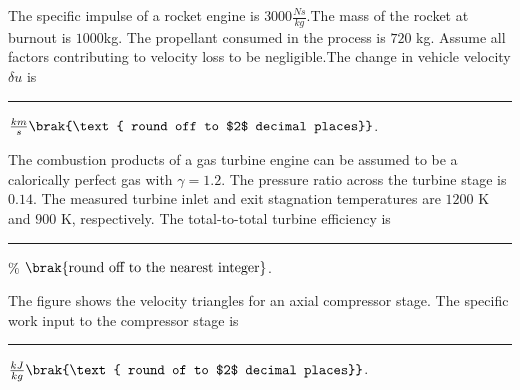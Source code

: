 {{}
\item{
The specific impulse of a rocket engine is $3000\frac{Ns}{kg}$.The mass of the rocket at burnout is $1000$kg. The propellant consumed in the process is $720$ kg. Assume all factors contributing to velocity loss to be negligible.The change in vehicle velocity $\delta u$ is \rule{2cm}{0.15mm} $\frac{km}{s}\brak{\text{ round off to $2$ decimal places}}$.\\
}
\item{
The combustion products of a gas turbine engine can be assumed to be a calorically perfect gas with $\gamma= 1.2$. The pressure ratio across the turbine stage is $0.14$. The measured turbine inlet and exit stagnation temperatures are $1200$ K and $900$ K, respectively. The total-to-total turbine efficiency is \rule{2cm}{0.15mm}$\%$ $\brak{\text{round off to the nearest integer}}$.
}
\item{
The figure shows the velocity triangles for an axial compressor stage. The specific work input to the compressor stage is \rule{2cm}{0.15mm}$\frac{kJ}{kg}\brak{\text{ round of to $2$ decimal places}}$.
\begin{figure}[H]
\centering
{}%
\label{fig:my_label}

\end{figure}}}
